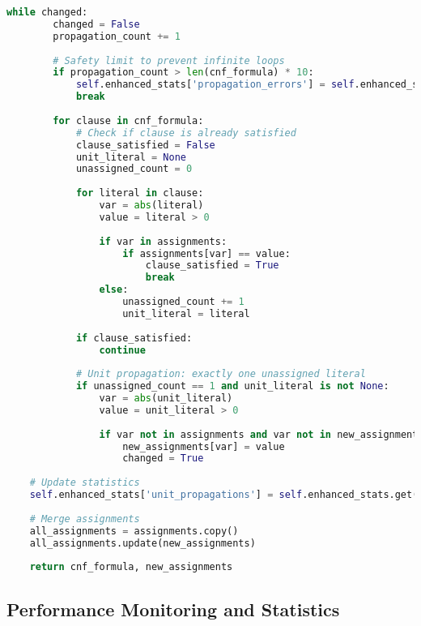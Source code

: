 \begin{lstlisting}[language=Python, caption=Streamlined Conflict Analysis with Graph Structure Integration]
    while changed:
        changed = False
        propagation_count += 1
        
        # Safety limit to prevent infinite loops
        if propagation_count > len(cnf_formula) * 10:
            self.enhanced_stats['propagation_errors'] = self.enhanced_stats.get('propagation_errors', 0) + 1
            break
        
        for clause in cnf_formula:
            # Check if clause is already satisfied
            clause_satisfied = False
            unit_literal = None
            unassigned_count = 0
            
            for literal in clause:
                var = abs(literal)
                value = literal > 0
                
                if var in assignments:
                    if assignments[var] == value:
                        clause_satisfied = True
                        break
                else:
                    unassigned_count += 1
                    unit_literal = literal
            
            if clause_satisfied:
                continue
            
            # Unit propagation: exactly one unassigned literal
            if unassigned_count == 1 and unit_literal is not None:
                var = abs(unit_literal)
                value = unit_literal > 0
                
                if var not in assignments and var not in new_assignments:
                    new_assignments[var] = value
                    changed = True
    
    # Update statistics
    self.enhanced_stats['unit_propagations'] = self.enhanced_stats.get('unit_propagations', 0) + len(new_assignments)
    
    # Merge assignments
    all_assignments = assignments.copy()
    all_assignments.update(new_assignments)
    
    return cnf_formula, new_assignments
\end{lstlisting}

\subsection{Performance Monitoring and Statistics}
\label{appendix:performance-monitoring}

